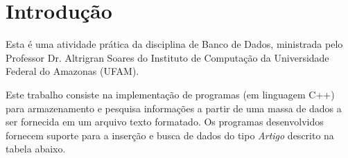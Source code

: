 \section{Introdução}\label{sec:introducao}





Esta é uma atividade prática da disciplina de Banco de Dados, ministrada pelo Professor Dr. Altrigran Soares do Instituto de Computação da Universidade Federal do Amazonas (UFAM).

Este trabalho consiste na implementação de programas (em linguagem C++) para armazenamento e pesquisa informações a partir de uma massa de dados a ser fornecida em um arquivo texto formatado.
Os programas desenvolvidos fornecem suporte para a inserção e busca de dados do tipo \emph{Artigo} descrito na tabela  abaixo.
